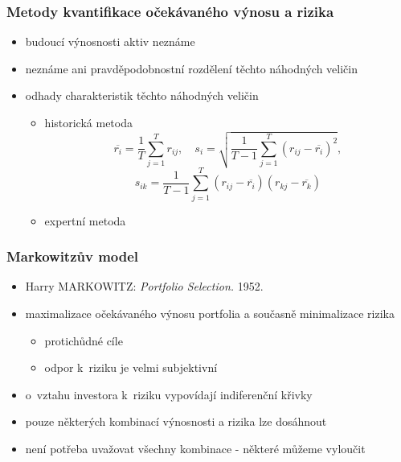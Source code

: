 \begin{frame}
    \frametitle{Metody kvantifikace očekávaného výnosu a rizika}
    \begin{itemize}
      \item budoucí výnosnosti aktiv neznáme
      \item neznáme ani pravděpodobnostní rozdělení těchto náhodných veličin
      \item odhady charakteristik těchto náhodných veličin
      	\begin{itemize}
			\item historická metoda
			\[
\overline{r_i}=\frac{1}{T}\sum_{j=1}^T r_{ij},
\quad
s_i=\sqrt{\frac{1}{T-1}\sum_{j=1}^T (r_{ij}-\overline{r_i})^2},
\]
\[
s_{ik}=\frac{1}{T-1}\sum_{j=1}^T (r_{ij}-\overline{r_i})(r_{kj}-\overline{r_k})
\]
			\item expertní metoda
		\end{itemize}
    \end{itemize}
  \end{frame}

\begin{frame}
    \frametitle{Markowitzův model}
    \begin{itemize}
      \item Harry MARKOWITZ: \emph{Portfolio Selection.} 1952.
      \item maximalizace očekávaného výnosu portfolia a současně minimalizace rizika
      \begin{itemize}
      \item protichůdné cíle 
      \item odpor k~riziku je velmi subjektivní
       \end{itemize}
      \item o~vztahu investora k~riziku vypovídají indiferenční křivky
      \item pouze některých kombinací výnosnosti a rizika lze dosáhnout
      \item není potřeba uvažovat všechny kombinace - některé můžeme vyloučit
    \end{itemize}
  \end{frame}
  
